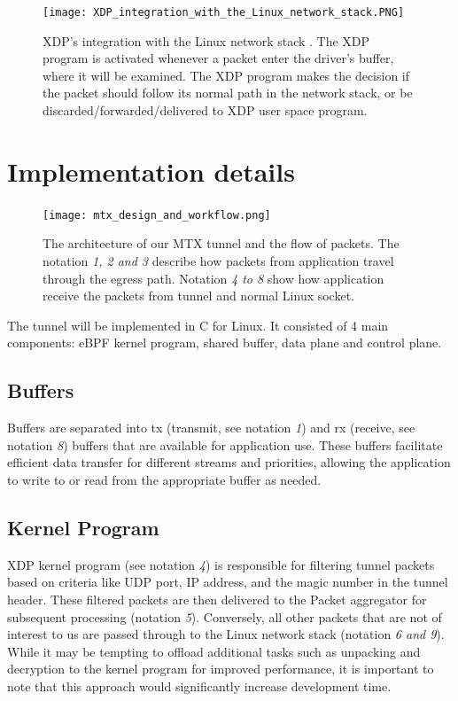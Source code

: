 \begin{figure}[H]
	\centering
	\texttt{[image: XDP\_integration\_with\_the\_Linux\_network\_stack.PNG]}
	\caption{XDP’s integration with the Linux network stack \cite{hoiland_jorgensen_express_2018}. The XDP program is activated whenever a packet enter the driver's buffer, where it will be examined. The XDP program makes the decision if the packet should follow its normal path in the network stack, or be discarded/forwarded/delivered to XDP user space program.}\label{fig:approach_design:xdp_architecture}
\end{figure}


\section{Implementation details}

\begin{figure}[H]
	\centering
	\texttt{[image: mtx\_design\_and\_workflow.png]}
	\caption{The architecture of our MTX tunnel and the flow of packets. The notation \textit{1, 2 and 3} describe how  packets from application travel through the egress path. Notation \textit{4 to 8} show how application receive the packets from tunnel and normal Linux socket.}
	\label{fig:approach_design:mtx_design_and_workflow}
\end{figure}

The tunnel will be implemented in C for Linux. It consisted of 4 main components: eBPF kernel program, shared buffer, data plane and control plane.

\subsection{Buffers}
Buffers are separated into tx (transmit, see notation \textit{1}) and rx (receive, see notation \textit{8}) buffers that are available for application use. 
These buffers facilitate efficient data transfer for different streams and priorities, allowing the application to write to or read from the appropriate buffer as needed.

\subsection{Kernel Program}
XDP kernel program (see notation \textit{4}) is responsible for filtering tunnel packets based on criteria like UDP port, IP address, and the magic number in the tunnel header. 
These filtered packets are then delivered to the Packet aggregator for subsequent processing (notation \textit{5}). 
Conversely, all other packets that are not of interest to us are passed through to the Linux network stack (notation \textit{6 and 9}).
While it may be tempting to offload additional tasks such as unpacking and decryption to the kernel program for improved performance, it is important to note that this approach would significantly increase development time.

